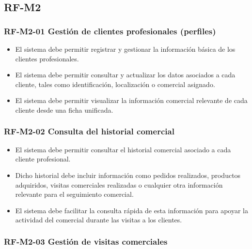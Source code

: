 \subsection{RF-M2}

\vspace{-0.75em}
\subsubsection{RF-M2-01 Gestión de clientes profesionales (perfiles)}
\vspace{-1em}

\begin{itemize}
    \item El sistema debe permitir registrar y gestionar la información básica de los clientes profesionales.
    \item El sistema debe permitir consultar y actualizar los datos asociados a cada cliente, tales como identificación, localización o comercial asignado.
    \item El sistema debe permitir visualizar la información comercial relevante de cada cliente desde una ficha unificada.
\end{itemize}

\vspace{-0.75em}
\subsubsection{RF-M2-02 Consulta del historial comercial}
\vspace{-1em}

\begin{itemize}
    \item El sistema debe permitir consultar el historial comercial asociado a cada cliente profesional.
    \item Dicho historial debe incluir información como pedidos realizados, productos adquiridos, visitas comerciales realizadas o cualquier otra información relevante para el seguimiento comercial.
    \item El sistema debe facilitar la consulta rápida de esta información para apoyar la actividad del comercial durante las visitas a los clientes.
\end{itemize}

\vspace{-0.75em}
\subsubsection{RF-M2-03 Gestión de visitas comerciales}
\vspace{-1em}

